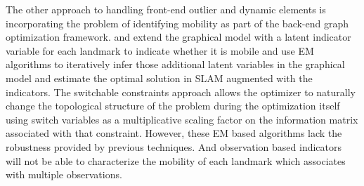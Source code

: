 The other approach to handling front-end outlier and dynamic elements is
incorporating the problem of identifying mobility as part of the back-end graph
optimization framework.  \cite{haehnel03iros} and \cite{rogers2010slam} extend
the graphical model with a latent indicator variable for each landmark to
indicate whether it is mobile and use EM algorithms to iteratively infer those
additional latent variables in the graphical model and estimate the optimal
solution in SLAM augmented with the indicators. The switchable
constraints\cite{Switchable12} approach allows the optimizer to naturally
change the topological structure of the problem during the optimization itself
using switch variables as a multiplicative scaling factor on the information
matrix associated with that constraint. However, these EM based algorithms lack
the robustness provided by previous techniques.  And observation based
indicators will not be able to characterize the mobility of each landmark which
associates with multiple observations.
